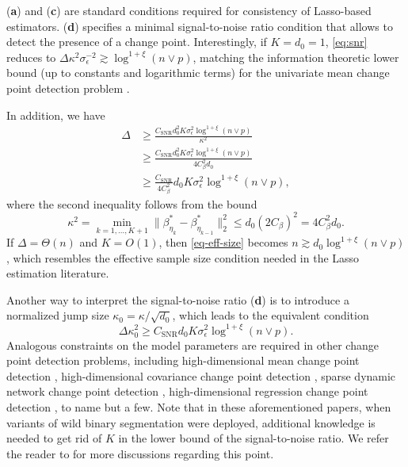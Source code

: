 \documentclass[twoside]{article}
\begin{document}
(\textbf{a}) and (\textbf{c}) are standard conditions required for consistency of Lasso-based estimators.  (\textbf{d}) specifies a minimal  signal-to-noise ratio condition that allows to detect the presence of a change point.  Interestingly, if $K = d_0 = 1$, \eqref{eq:snr} reduces to $\Delta \kappa^2 \sigma^{-2}_{\epsilon}\gtrsim \log^{1 + \xi}(n \vee p)$, matching the information theoretic lower bound  (up to constants and logarithmic terms) for the univariate mean change point detection problem \citep[see e.g.][]{chan2013, FrickEtal2014, wang2018univariate}.
			
In addition, we have
	\begin{align}\label{eq-eff-size}
		\Delta & \geq \frac{C_{\mathrm{SNR}} d_0^2 K \sigma^2_{\epsilon} \log^{1 + \xi}(n \vee p)}{\kappa^2} \nonumber \\
		& \geq 	\frac{C_{\mathrm{SNR}} d_0^2 K \sigma^2_{\epsilon} \log^{1 + \xi}(n \vee p)}{4C_{\beta}^2 d_0} \nonumber \\
		& \geq \frac{C_{\mathrm{SNR}}}{4C_{\beta}^2} d_0 K \sigma^2_{\epsilon} \log^{1+\xi}(n \vee p),
	\end{align}
	where the second inequality follows from the bound
	\[
		\kappa^2 = \min_{k = 1, \ldots, K + 1} \| \beta^*_{\eta_k} - \beta^*_{\eta_{k-1}}\|_2^2 \leq d_0 (2C_{\beta})^2 = 4C_{\beta}^2 d_0.
	\]
   If $\Delta = \Theta (n)$ and $K=O(1)$, then \eqref{eq-eff-size}  becomes $ n \gtrsim d_0 \log^{1+\xi}(n \vee p)$, 
   which  resembles the effective sample size condition needed in the Lasso estimation literature.
	
Another way to interpret the signal-to-noise ratio (\textbf{d}) is to introduce a normalized jump size $\kappa_0 = \kappa/\sqrt{d_0}$, which leads to the equivalent condition
	\[
		\Delta \kappa_0^2 \geq C_{\mathrm{SNR}} d_0 K \sigma^2_{\epsilon} \log^{1+\xi}(n \vee p).
	\]
	Analogous constraints on the model parameters are required in other change point detection problems, including high-dimensional mean change point detection \citep{wang2018high}, high-dimensional covariance change point detection \citep{wang2017optimal}, sparse dynamic network change point detection \citep{wang2018optimal}, high-dimensional regression change point detection \citep{wang2019statistically}, to name but a few.  Note that in these aforementioned papers, when variants of wild binary segmentation \citep{fryzlewicz2014wild} were deployed, additional knowledge is needed to get rid of $K$ in the lower bound of the signal-to-noise ratio.  We refer the reader to \cite{wang2018optimal} for more discussions regarding this point.
	
\end{document}
